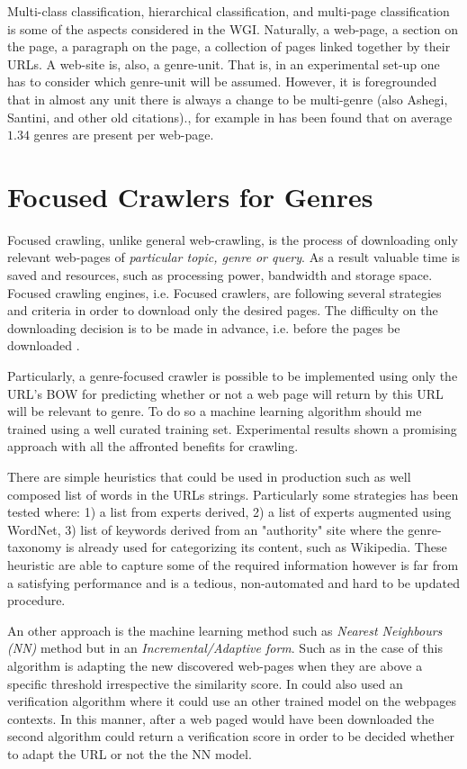 Multi-class classification, hierarchical classification, and multi-page classification is some of the aspects considered in the WGI. Naturally, a web-page, a section on the page, a paragraph on the page, a collection of pages linked together by their URLs. A web-site is, also, a genre-unit. That is, in an experimental set-up one has to consider which genre-unit will be assumed. However, it is foregrounded that in almost any unit there is always a change to be multi-genre \parencite{lee2017text} (also Ashegi, Santini, and other old citations)., for example in \parencite{madjarov2015web} has been found that on average $1.34$ genres are present per web-page.

\section{Focused Crawlers for Genres}\label{chap:relevant_work:sec:focused_crawlers}

Focused crawling, unlike general web-crawling, is the process of downloading only relevant web-pages of \textit{particular topic, genre or query}. As a result valuable time is saved and resources, such as processing power, bandwidth and storage space. Focused crawling engines, i.e. Focused crawlers, are following several strategies and criteria in order to download only the desired pages. The difficulty on the downloading decision is to be made in advance, i.e. before the pages be downloaded \parencite{priyatam2013don_URL} . 
 
Particularly, a genre-focused crawler is possible to be implemented using only the URL's BOW for predicting whether or not a web page will return by this URL will be relevant to genre. To do so a machine learning algorithm should me trained using a well curated training set. Experimental results shown a promising approach with all the affronted benefits for crawling.

There are simple heuristics that could be used in production such as well composed list of words in the URLs strings. Particularly some strategies has been tested where: 1) a list from experts derived, 2) a list of experts augmented using WordNet, 3) list of keywords derived from an "authority" site where the genre-taxonomy is already used for categorizing its content, such as Wikipedia. These heuristic are able to capture some of the required information however is far from a satisfying performance and is a tedious, non-automated and hard to be updated procedure.

An other approach is the machine learning method such as \textit{Nearest Neighbours (NN)} method but in an \textit{Incremental/Adaptive form}. Such as in the case of \parencite{jebari2015combination} this algorithm is adapting the new discovered web-pages when they are above a specific threshold irrespective the similarity score. In could also used an verification algorithm where it could use an other trained model on the webpages contexts. In this manner, after a web paged would have been downloaded the second algorithm could return a verification score in order to be decided whether to adapt the URL or not the the NN model. 

